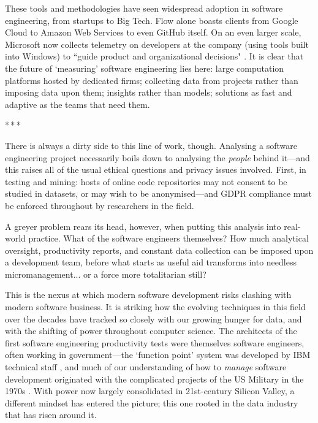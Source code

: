 \documentclass[12pt]{article}
\newcommand{\parbreak}{\bigskip\par\centerline{*\,*\,*}\medskip\par}
\begin{document}
	These tools and methodologies have seen widespread adoption in software engineering, from startups to Big Tech. Flow alone boasts clients from Google Cloud to Amazon Web Services to even GitHub itself. On an even larger scale, Microsoft now collects telemetry on developers at the company (using tools built into Windows) to ``guide product and organizational decisions" \cite{windows}. It is clear that the future of `measuring' software engineering lies here: large computation platforms hosted by dedicated firms; collecting data from projects rather than imposing data upon them; insights rather than models; solutions as fast and adaptive as the teams that need them.
	
	\parbreak
	
	There is always a dirty side to this line of work, though. Analysing a software engineering project necessarily boils down to analysing the \textit{people} behind it---and this raises all of the usual ethical questions and privacy issues involved. First, in testing and mining: hosts of online code repositories may not consent to be studied in datasets, or may wish to be anonymised---and GDPR compliance must be enforced throughout by research\-ers in the field.
	
	A greyer problem rears its head, however, when putting this analysis into real-world practice. What of the software engineers themselves? How much analytical oversight, productivity reports, and constant data collection can be imposed upon a development team, before what starts as useful aid transforms into needless micromanagement... or a force more totalitarian still?
	
	This is the nexus at which modern software development risks clashing with modern software business. It is striking how the evolving techniques in this field over the decades have tracked so closely with our growing hunger for data, and with the shifting of power throughout computer science. The architects of the first software engineering productivity tests were themselves software engineers, often working in government---the `function point' system was developed by IBM technical staff \cite{stutzke}, and much of our understanding of how to \textit{manage} software development originated with the complicated projects of the US Military in the 1970s \cite{rand}. With power now largely consolidated in 21st-century Silicon Valley, a different mindset has entered the picture; this one rooted in the data industry that has risen around it.
	
\end{document}
